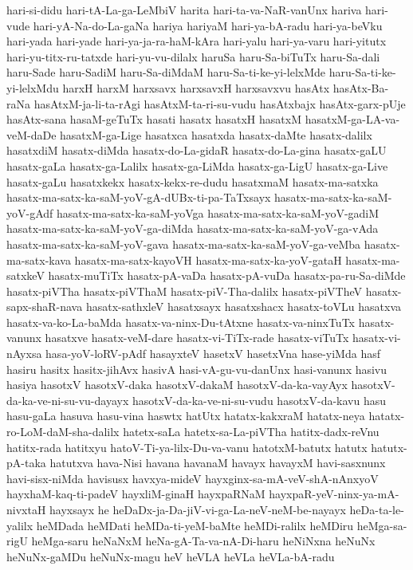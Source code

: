 {hari-si-didu
hari-tA-La-ga-LeMbiV
harita
hari-ta-va-NaR-vanUnx
hariva
hari-vude
hari-yA-Na-do-La-gaNa
hariya
hariyaM
hari-ya-bA-radu
hari-ya-beVku
hari-yada
hari-yade
hari-ya-ja-ra-haM-kAra
hari-yalu
hari-ya-varu
hari-yitutx
hari-yu-titx-ru-tatxde
hari-yu-vu-dilalx
haruSa
haru-Sa-biTuTx
haru-Sa-dali
haru-Sade
haru-SadiM
haru-Sa-diMdaM
haru-Sa-ti-ke-yi-lelxMde
haru-Sa-ti-ke-yi-lelxMdu
harxH
harxM
harxsavx
harxsavxH
harxsavxvu
hasAtx
hasAtx-Ba-raNa
hasAtxM-ja-li-ta-rAgi
hasAtxM-ta-ri-su-vudu
hasAtxbajx
hasAtx-garx-pUje
hasAtx-sana
hasaM-geTuTx
hasati
hasatx
hasatxH
hasatxM
hasatxM-ga-LA-va-veM-daDe
hasatxM-ga-Lige
hasatxca
hasatxda
hasatx-daMte
hasatx-dalilx
hasatxdiM
hasatx-diMda
hasatx-do-La-gidaR
hasatx-do-La-gina
hasatx-gaLU
hasatx-gaLa
hasatx-ga-Lalilx
hasatx-ga-LiMda
hasatx-ga-LigU
hasatx-ga-Live
hasatx-gaLu
hasatxkekx
hasatx-kekx-re-dudu
hasatxmaM
hasatx-ma-satxka
hasatx-ma-satx-ka-saM-yoV-gA-dUBx-ti-pa-TaTxsayx
hasatx-ma-satx-ka-saM-yoV-gAdf
hasatx-ma-satx-ka-saM-yoVga
hasatx-ma-satx-ka-saM-yoV-gadiM
hasatx-ma-satx-ka-saM-yoV-ga-diMda
hasatx-ma-satx-ka-saM-yoV-ga-vAda
hasatx-ma-satx-ka-saM-yoV-gava
hasatx-ma-satx-ka-saM-yoV-ga-veMba
hasatx-ma-satx-kava
hasatx-ma-satx-kayoVH
hasatx-ma-satx-ka-yoV-gataH
hasatx-ma-satxkeV
hasatx-muTiTx
hasatx-pA-vaDa
hasatx-pA-vuDa
hasatx-pa-ru-Sa-diMde
hasatx-piVTha
hasatx-piVThaM
hasatx-piV-Tha-dalilx
hasatx-piVTheV
hasatx-sapx-shaR-nava
hasatx-sathxleV
hasatxsayx
hasatxshacx
hasatx-toVLu
hasatxva
hasatx-va-ko-La-baMda
hasatx-va-ninx-Du-tAtxne
hasatx-va-ninxTuTx
hasatx-vanunx
hasatxve
hasatx-veM-dare
hasatx-vi-TiTx-rade
hasatx-viTuTx
hasatx-vi-nAyxsa
hasa-yoV-loRV-pAdf
hasayxteV
hasetxV
hasetxVna
hase-yiMda
hasf
hasiru
hasitx
hasitx-jihAvx
hasivA
hasi-vA-gu-vu-danUnx
hasi-vanunx
hasivu
hasiya
hasotxV
hasotxV-daka
hasotxV-dakaM
hasotxV-da-ka-vayAyx
hasotxV-da-ka-ve-ni-su-vu-dayayx
hasotxV-da-ka-ve-ni-su-vudu
hasotxV-da-kavu
hasu
hasu-gaLa
hasuva
hasu-vina
haswtx
hatUtx
hatatx-kakxraM
hatatx-neya
hatatx-ro-LoM-daM-sha-dalilx
hatetx-saLa
hatetx-sa-La-piVTha
hatitx-dadx-reVnu
hatitx-rada
hatitxyu
hatoV-Ti-ya-lilx-Du-va-vanu
hatotxM-batutx
hatutx
hatutx-pA-taka
hatutxva
hava-Nisi
havana
havanaM
havayx
havayxM
havi-sasxnunx
havi-sisx-niMda
havisusx
havxya-mideV
hayxginx-sa-mA-veV-shA-nAnxyoV
hayxhaM-kaq-ti-padeV
hayxliM-ginaH
hayxpaRNaM
hayxpaR-yeV-ninx-ya-mA-nivxtaH
hayxsayx
he
heDaDx-ja-Da-jiV-vi-ga-La-neV-neM-be-nayayx
heDa-ta-le-yalilx
heMDada
heMDati
heMDa-ti-yeM-baMte
heMDi-ralilx
heMDiru
heMga-sa-rigU
heMga-saru
heNaNxM
heNa-gA-Ta-va-nA-Di-haru
heNiNxna
heNuNx
heNuNx-gaMDu
heNuNx-magu
heV
heVLA
heVLa
heVLa-bA-radu
}
